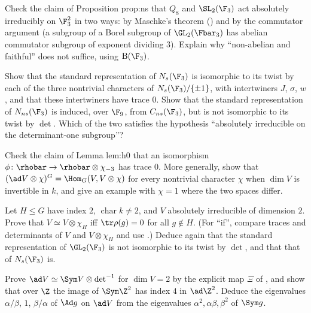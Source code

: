 \begin{exercise}\label{ex:reps:ex6}
Check the claim of Proposition prop:ns that $Q_8$ and $\SL_2(\F_3)$ act absolutely irreducibly on $\F_3^2$ in two ways: by Maschke's theorem
() and by the commutator argument (a subgroup of a Borel subgroup of $\GL_2(\Fbar_3)$ has abelian commutator subgroup of
exponent dividing $3$). Explain why ``non-abelian and faithful'' does not suffice, using $\mathrm B(\F_3)$.
\end{exercise}

\begin{exercise}\label{ex:reps:ex7}
Show that the standard representation of $N_s(\F_3)$ is isomorphic to its twist by each of the three nontrivial characters of $N_s(\F_3)/\{\pm1\}$, with
intertwiners $J$, $\sigma$, $w$, and that these intertwiners have trace $0$. Show that the standard representation of $N_{ns}(\F_3)$ is induced, over $\F_9$,
from $C_{ns}(\F_3)$, but is not isomorphic to its twist by $\det$. Which of the two satisfies the hypothesis ``absolutely irreducible on the
determinant-one subgroup''?
\end{exercise}

\begin{exercise}\label{ex:reps:ex8}
Check the claim of Lemma lem:h0 that an isomorphism $\phi\colon\rhobar\to\rhobar\otimes\chi_{-3}$ has trace $0$. More generally, show that
$(\ad V\otimes\chi)^G=\Hom_G(V,V\otimes\chi)$ for every nontrivial character $\chi$ when $\dim V$ is invertible in $k$, and give an example with $\chi=1$ where the
two spaces differ.
\end{exercise}

\begin{exercise}\label{ex:reps:ex9}
Let $H\le G$ have index $2$, $\operatorname{char}k\ne2$, and $V$ absolutely irreducible of dimension $2$. Prove that $V\simeq V\otimes\chi_H$ iff $\tr\rho(g)=0$ for all
$g\notin H$. (For ``if'', compare traces and determinants of $V$ and $V\otimes\chi_H$ and use .) Deduce again that the
standard representation of $\GL_2(\F_3)$ is not isomorphic to its twist by $\det$, and that that of $N_s(\F_3)$ is.
\end{exercise}

\begin{exercise}\label{ex:reps:ex10}
Prove $\ad V\simeq\Sym V\otimes\det^{-1}$ for $\dim V=2$ by the explicit map $\Xi$ of , and show that over $\Z$ the image of $\Sym\Z^2$ has index
$4$ in $\ad\Z^2$. Deduce the eigenvalues $\alpha/\beta$, $1$, $\beta/\alpha$ of $\Ad g$ on $\ad V$ from the eigenvalues $\alpha^2,\alpha\beta,\beta^2$ of $\Sym g$.
\end{exercise}

